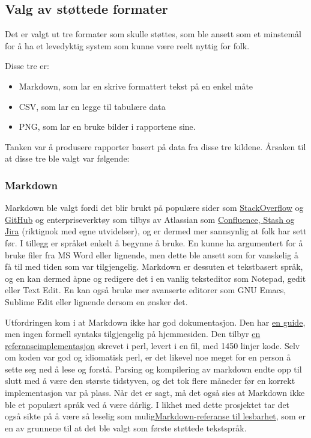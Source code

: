 \documentclass[norsk, 11pt, a4paper]{article}
\begin{document}
\subsection{Valg av støttede formater}

Det er valgt ut tre formater som skulle støttes, som ble ansett som et minstemål for å ha et levedyktig system som kunne være reelt nyttig for folk.

Disse tre er:

\begin{itemize}
\item Markdown, som lar en skrive formattert tekst på en enkel måte
\item CSV, som lar en legge til tabulære data
\item PNG, som lar en bruke bilder i rapportene sine.
\end{itemize}


Tanken var å produsere rapporter basert på data fra disse tre kildene. Årsaken til at disse tre ble valgt var følgende:

\subsubsection{Markdown}



Markdown ble valgt fordi det blir brukt på populære sider som \href{http://stackoverflow.com/editing-help}{StackOverflow} og \href{https://help.github.com/articles/github-flavored-markdown/}{GitHub} og enterpriseverktøy som tilbys av Atlassian som \href{https://confluence.atlassian.com/display/STASH/Markdown+syntax+guide}{Confluence, Stash og Jira} (riktignok med egne utvidelser), og er dermed mer sannsynlig at folk har sett før. I tillegg er språket enkelt å begynne å bruke. En kunne ha argumentert for å bruke filer fra MS Word eller lignende, men dette ble ansett som for vanskelig å få til med tiden som var tilgjengelig. Markdown er dessuten et tekstbasert språk, og en kan dermed åpne og redigere det i en vanlig teksteditor som Notepad, gedit eller Text Edit. En kan også bruke mer avanserte editorer som GNU Emacs, Sublime Edit eller lignende dersom en ønsker det.



Utfordringen kom i at Markdown ikke har god dokumentasjon. Den har \href{http://daringfireball.net/projects/markdown/syntax}{en guide}, men ingen formell syntaks tilgjengelig på hjemmesiden. Den tilbyr \href{http://daringfireball.net/projects/markdown/}{en referanseimplementasjon} skrevet i perl, levert i en fil, med 1450 linjer kode. Selv om koden var god og idiomatisk perl, er det likevel noe meget for en person å sette seg ned å lese og forstå. Parsing og kompilering av markdown endte opp til slutt med å være den største tidstyven, og det tok flere måneder før en korrekt implementasjon var på plass. Når det er sagt, må det også sies at Markdown ikke ble et populært språk ved å være dårlig. I likhet med dette prosjektet tar det også sikte på å være så leselig som mulig\href{http://daringfireball.net/projects/markdown/}{Markdown-referanse til lesbarhet}, som er en av grunnene til at det ble valgt som første støttede tekstspråk.
\end{document}
